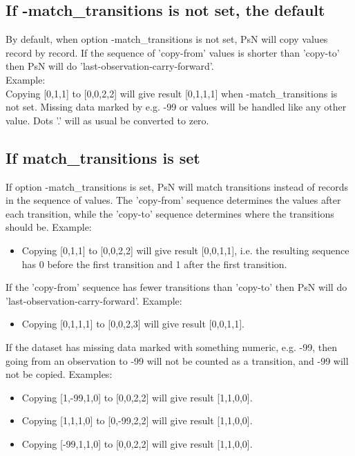 \subsection{If -match\_transitions is not set, the default}
By default, when option -match\_transitions is not set, PsN will copy values record by record. If the sequence of 'copy-from' values is shorter than 'copy-to' then PsN will do 'last-observation-carry-forward'. \\
Example:\\ 
Copying [0,1,1] to [0,0,2,2] will give result [0,1,1,1] when -match\_transitions is not set. Missing data marked by e.g. -99 or values will be handled like any other value. Dots '.' will as usual be converted to zero. 

\subsection{If match\_transitions is set}
If option -match\_transitions is set, PsN will match transitions instead of records in the sequence of values. The 'copy-from' sequence determines the values after each transition, while the 'copy-to' sequence determines where the transitions should be. Example: 
\begin{itemize}
\item Copying [0,1,1] to [0,0,2,2] will give result [0,0,1,1], i.e. the resulting sequence has 0 before the first transition and 1 after the first transition. 
\end{itemize}

\noindent If the 'copy-from' sequence has fewer transitions than 'copy-to' then PsN will do 'last-observation-carry-forward'. Example:
\begin{itemize}
\item Copying [0,1,1,1] to [0,0,2,3] will give result [0,0,1,1]. 
\end{itemize}
\noindent If the dataset has missing data marked with something numeric, e.g. -99, then going from an observation to -99 will not be counted as a transition, and -99 will not be copied. Examples:
\begin{itemize}
\item Copying [1,-99,1,0] to [0,0,2,2] will give result [1,1,0,0]. 
\item Copying [1,1,1,0] to [0,-99,2,2] will give result [1,1,0,0].
\item Copying [-99,1,1,0] to [0,0,2,2] will give result [1,1,0,0]. 
\end{itemize}

